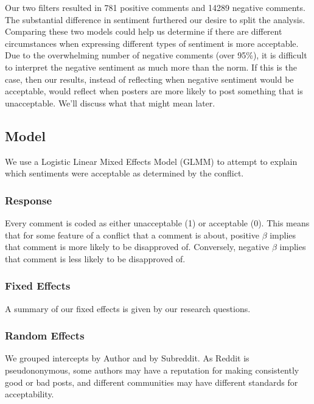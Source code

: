 Our two filters resulted in 781 positive comments and 14289 negative comments. The substantial difference in sentiment furthered our desire to split the analysis. Comparing these two models could help us determine if there are different circumstances when expressing different types of sentiment is more acceptable. Due to the overwhelming number of negative comments (over 95\%), it is difficult to interpret the negative sentiment as much more than the norm. If this is the case, then our results, instead of reflecting when negative sentiment would be acceptable, would reflect when posters are more likely to post something that is unacceptable. We'll discuss what that might mean later.

\subsection{Model}
We use a Logistic Linear Mixed Effects Model (GLMM) to attempt to explain which sentiments were acceptable as determined by the conflict.

\subsubsection{Response}
Every comment is coded as either unacceptable (1) or acceptable (0). This means that for some feature of a conflict that a comment is about, positive $\beta$ implies that comment is more likely to be disapproved of. Conversely, negative $\beta$ implies that comment is less likely to be disapproved of. 

\subsubsection{Fixed Effects}
A summary of our fixed effects is given by our research questions.

\subsubsection{Random Effects}
We grouped intercepts by Author and by Subreddit. As Reddit is pseudononymous, some authors may have a reputation for making consistently good or bad posts, and different communities may have different standards for acceptability.